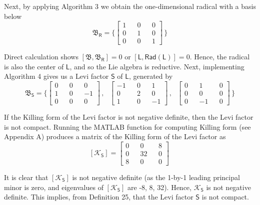\documentclass[11pt,a4paper]{article}
\begin{document}
Next, by applying Algorithm 3 we obtain the one-dimensional radical with a basis below
$$
\mathfrak{B}_\mathsf{R} = \{ 
	\left[
	\begin{aligned}
	 1 && 0 &&  0  \\
	 0 && 1 &&  0  \\
	 0 && 0 &&  1
	\end{aligned}
	\right]\,
	\}
$$

Direct calculation shows $[\mathfrak{B},\mathfrak{B}_{\mathsf{R}}] = 0$ or $[\mathsf{L},\mathsf{Rad}(\mathsf{L})] = 0$. Hence, the radical is also the center of $\mathsf{L}$, and so the Lie algebra is reductive. Next, implementing Algorithm 4 gives us a Levi factor $\mathsf{S}$ of $\mathsf{L}$, generated by
$$ \mathfrak{B}_{\mathsf{S}} =
\{
	\left[
	\begin{aligned}
	 0 && 0 && 0 \\
	 1 && 0 && -1  \\
	 0 && 0 && 0
	\end{aligned}
	\right]\,, \text{ }
	\left[
	   \begin{aligned}
		 -1 && 0 && 1  \\
	 	 0 &&  2 && 0  \\
	 	 1 &&  0 && -1
	   \end{aligned}
	  \right]\,, \text{ }
\left[
	\begin{aligned}
	 0 && 1 && 0 \\
	 0 && 0 && 0  \\
	 0 && -1 && 0
	\end{aligned}
	\right]\,
\}
$$ 

If the Killing form of the Levi factor is not negative definite, then the Levi factor is not compact. Running the MATLAB function for computing Killing form (see Appendix A) produces a matrix of the Killing form of the Levi factor as
$$
[\mathcal{K}_{\mathsf{S}}] = 
	\left[
	\begin{aligned}
	 0 &&  0 &&  8  \\
	 0 && 32 &&  0  \\
	 8 &&  0 &&  0
	\end{aligned}
	\right]\,
$$

It is clear that $[\mathcal{K}_{\mathsf{S}}]$ is not negative definite (as the 1-by-1 leading principal minor is zero, and eigenvalues of $[\mathcal{K}_{\mathsf{S}}]$ are -8, 8, 32). Hence, $\mathcal{K}_{\mathsf{S}}$ is not negative definite. This implies, from Definition 25, that the Levi factor $\mathsf{S}$ is not compact.\\
\end{document}
